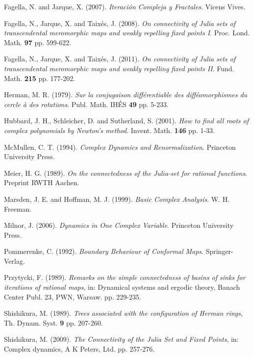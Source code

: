  {\sc Fagella, N. and Jarque, X.} (2007). {\em Iteración Compleja y Fractales}. Vicens Vives.

 {\sc Fagella, N., Jarque, X. and Taixés, J.} (2008). {\em On connectivity of Julia sets of transcendental meromorphic maps and weakly repelling fixed points I}. Proc. Lond. Math. {\bf 97} pp. 599-622.

 {\sc Fagella, N., Jarque, X. and Taixés, J.} (2011). {\em On connectivity of Julia sets of transcendental meromorphic maps and weakly repelling fixed points II}. Fund. Math. {\bf 215} pp. 177-202.

 {\sc Herman, M. R.} (1979). {\em Sur la conjugaison différentiable des difféomorphismes du cercle à des rotations}. Publ. Math. IHÉS {\bf 49} pp. 5-233.

 {\sc Hubbard, J. H., Schleicher, D. and Sutherland, S.} (2001). {\em How to find all roots of complex polynomials by Newton's method}. Invent. Math. {\bf 146} pp. 1-33.

 {\sc McMullen, C. T.} (1994). {\em Complex Dynamics and Renormalization}. Princeton University Press.

 {\sc Meier, H. G.} (1989). {\em On the connectedness of the Julia-set for rational functions}. Preprint RWTH Aachen.

 {\sc Marsden, J. E. and Hoffman, M. J.} (1999). {\em Basic Complex Analysis}. W. H. Freeman.

 {\sc Milnor, J.} (2006). {\em Dynamics in One Complex Variable}. Princeton University Press.


 {\sc Pommerenke, C.} (1992). {\em Boundary Behaviour of Conformal Maps}. Springer-Verlag.

 {\sc Przytycki, F.} (1989). {\em Remarks on the simple connectedness of basins of sinks for iterations of rational maps}, in: Dynamical systems and ergodic theory, Banach Center Publ. 23, PWN, Warsaw. pp. 229-235.

 {\sc Shishikura, M.} (1989). {\em Trees associated with the configuration of Herman rings}, Th. Dynam. Syst. {\bf 9} pp. 207-260.

 {\sc Shishikura, M.} (2009). {\em The Connectivity of the Julia Set and Fixed Points}, in: Complex dynamics, A K Peters, Ltd. pp. 257-276. 

